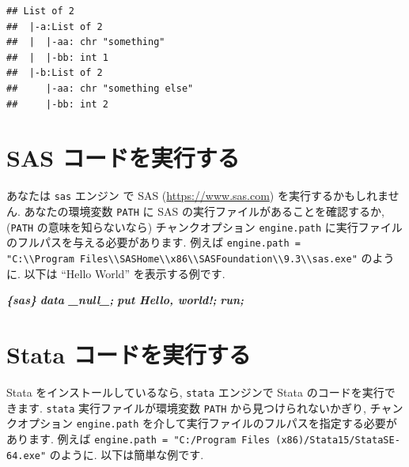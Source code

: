 \documentclass[
  11pt,
  lualatex,
  ja=standard]{bxjsreport}
\newenvironment{Shaded}{\begin{snugshade}}{\end{snugshade}}
\newcommand{\InformationTok}[1]{\textcolor[rgb]{0.56,0.35,0.01}{\textbf{\textit{#1}}}}
\begin{document}
\begin{verbatim}
## List of 2
##  |-a:List of 2
##  |  |-aa: chr "something"
##  |  |-bb: int 1
##  |-b:List of 2
##     |-aa: chr "something else"
##     |-bb: int 2
\end{verbatim}

\hypertarget{eng-sas}{%
\section{SAS コードを実行する}\label{eng-sas}}

あなたは \texttt{sas} エンジン で SAS (\url{https://www.sas.com}) を実行するかもしれません. あなたの環境変数 \texttt{PATH} に SAS の実行ファイルがあることを確認するか, (\texttt{PATH} の意味を知らないなら) チャンクオプション \texttt{engine.path} に実行ファイルのフルパスを与える必要があります. 例えば \texttt{engine.path = "C:\textbackslash{}\textbackslash{}Program\ Files\textbackslash{}\textbackslash{}SASHome\textbackslash{}\textbackslash{}x86\textbackslash{}\textbackslash{}SASFoundation\textbackslash{}\textbackslash{}9.3\textbackslash{}\textbackslash{}sas.exe"} のように. 以下は ``Hello World'' を表示する例です.

\begin{Shaded}
\begin{Highlighting}[]
\InformationTok{\textasciigrave{}\textasciigrave{}\textasciigrave{}\{sas\}}
\InformationTok{data \_null\_;}
\InformationTok{put \textquotesingle{}Hello, world!\textquotesingle{};}
\InformationTok{run;}
\InformationTok{\textasciigrave{}\textasciigrave{}\textasciigrave{}}
\end{Highlighting}
\end{Shaded}

\hypertarget{eng-stata}{%
\section{Stata コードを実行する}\label{eng-stata}}

Stata をインストールしているなら, \texttt{stata} エンジンで Stata のコードを実行できます. \texttt{stata} 実行ファイルが環境変数 \texttt{PATH} から見つけられないかぎり, チャンクオプション \texttt{engine.path} を介して実行ファイルのフルパスを指定する必要があります. 例えば \texttt{engine.path = "C:/Program Files (x86)/Stata15/StataSE-64.exe"} のように. 以下は簡単な例です.
\end{document}
